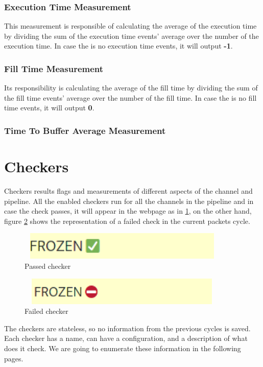 \subsubsection{Execution Time Measurement}
This measurement is responsible of calculating the average of the execution time by dividing the sum
of the execution time events' average over the number of the execution time. In case the is no execution
time events, it will output \textbf{-1}.

\subsubsection{Fill Time Measurement}
Its responsibility is calculating the average of the fill time by dividing the sum
of the fill time events' average over the number of the fill time. In case the is no fill
time events, it will output \textbf{0}.

\subsubsection{Time To Buffer Average Measurement}\label{sec:time_to_buffer_average}

\section{Checkers}\label{sec::checkers}
Checkers results flags and measurements of different aspects of the channel and pipeline. All 
the enabled checkers run for all the channels in the pipeline and in case the check passes, it will appear
in the webpage as in \ref{fig:passed_checker}, on the other hand, figure \ref{fig:failed_checker} shows 
the representation of a failed check in the current packets cycle.
\newline
\begin{figure}[H]
	\centering
	\includegraphics[width=0.9\textwidth,height=50px]{images/passed_checker.png}
	\caption{Passed checker}
	\label{fig:passed_checker}
\end{figure}

\begin{figure}[H]
	\centering
	\includegraphics[width=0.9\textwidth,height=50px]{images/failed_checker.png}
	\caption{Failed checker}
	\label{fig:failed_checker}
\end{figure}
The checkers are stateless, so no information from the previous cycles is saved. Each checker has a name, 
can have a configuration, and a description of what does it check. We are going to enumerate these information
in the following pages.

